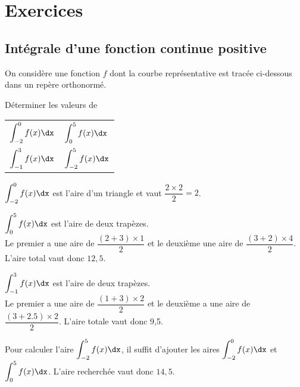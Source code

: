\documentclass[11pt,fleqn, openany]{book} %
\begin{document}

\chapter{Exercices}

\section*{Intégrale d'une fonction continue positive}


\begin{exercise}
On considère une fonction $f$ dont la courbe représentative est tracée ci-dessous dans un repère orthonormé.

\begin{minipage}{0.55\linewidth}
Déterminer les valeurs de 
\vskip10pt
\renewcommand{\arraystretch}{2.5}
\begin{tabularx}{\linewidth}{XX}$\displaystyle\int_{-2}^0f(x)\dx$ & $\displaystyle\int_{0}^5f(x)\dx$ \\ $\displaystyle\int_{-1}^3f(x)\dx$ & $\displaystyle\int_{-2}^5f(x)\dx$\end{tabularx}

\end{minipage}\hfill\begin{minipage}{0.4\linewidth}
\end{minipage}


\end{exercise}

\begin{solution}
 \(\displaystyle\int_{-2}^0f(x)\dx\) est l'aire d'un triangle et vaut \(\dfrac{2 \times 2}{2}=2\).

 \(\displaystyle\int_{0}^5f(x)\dx\) est l'aire de deux trapèzes. \\Le premier a une aire de \(\dfrac{(2+3)\times 1}{2}\) et le deuxième une aire de \(\dfrac{(3+2)\times 4}{2}\). L'aire total vaut donc \(12,5\).


 \(\displaystyle\int_{-1}^3f(x)\dx\) est l'aire de deux trapèzes. \\Le premier a une aire de \(\dfrac{(1+3) \times 2}{2}\) et le deuxième a une aire de \(\dfrac{(3+2.5)\times 2}{2}\). L'aire totale vaut donc 9,5.

 Pour calculer l'aire \(\displaystyle\int_{-2}^5f(x)\dx\), il suffit d'ajouter les aires \(\displaystyle\int_{-2}^0f(x)\dx\) et \(\displaystyle\int_{0}^5f(x)\dx\). L'aire recherchée vaut donc \(14,5\).\end{solution}
\end{document}

